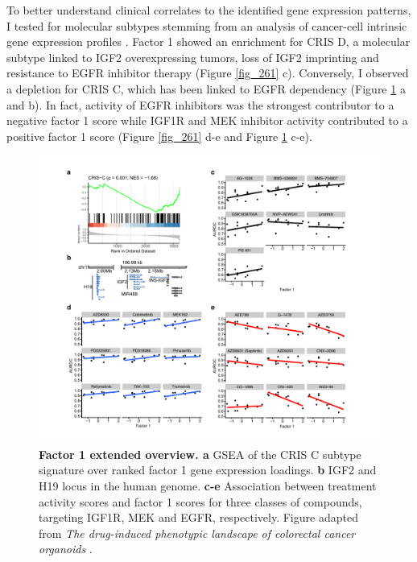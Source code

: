 \begin{flushleft}
\bigbreak
To better understand clinical correlates to the identified gene expression patterns, I tested for molecular subtypes stemming from an analysis of cancer-cell intrinsic gene expression profiles \cite{Isella2017-bm}. Factor 1 showed an enrichment for CRIS D, a molecular subtype linked to IGF2 overexpressing tumors, loss of IGF2 imprinting and resistance to EGFR inhibitor therapy (Figure \ref{fig_261} c). Conversely, I observed a depletion for CRIS C, which has been linked to EGFR dependency (Figure \ref{fig_262} a and b). In fact, activity of EGFR inhibitors was the strongest contributor to a negative factor 1 score while IGF1R and MEK inhibitor activity contributed to a positive factor 1 score (Figure \ref{fig_261} d-e and Figure \ref{fig_262} c-e).

\begin{figure}[h!]
\centering
\includegraphics[width=\textwidth,
                height=\textheight,
                keepaspectratio]{figures/promise/pdf/fig_6_2.pdf}
\caption{\textbf{Factor 1 extended overview. a} GSEA of the CRIS C subtype signature over ranked factor 1 gene expression loadings. \textbf{b} IGF2 and H19 locus in the human genome. \textbf{c-e} Association between treatment activity scores and factor 1 scores for three classes of compounds, targeting IGF1R, MEK and EGFR, respectively. Figure adapted from \textit{The drug-induced phenotypic landscape of colorectal cancer organoids} \cite{Betge2022-kr}.}
\label{fig_262}
\end{figure}


\end{flushleft}
